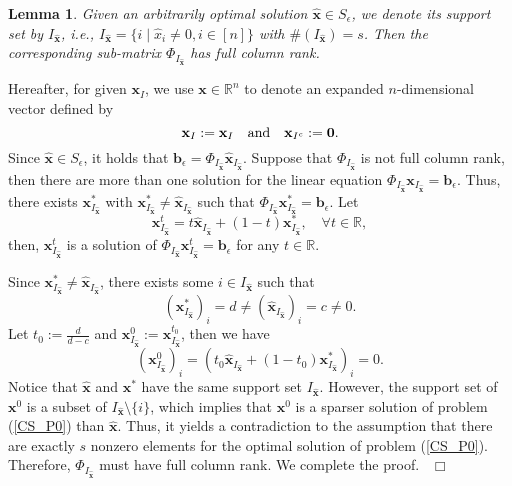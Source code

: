 \documentclass[12pt]{article}
\newtheorem{Lemma}{Lemma}[part]
\def \ep{\hbox{ }\hfill$\Box$}
\begin{document}
\begin{Lemma}\label{linearly_independent_columns}
Given an arbitrarily optimal solution $\hat{\mathbf{x}}\in S_\epsilon$, we denote its support set by $I_{\hat{\mathbf{x}}}$, i.e., $I_{\hat{\mathbf{x}}}=\{i\mid \hat{x}_i\neq0,i\in[n]\}$ with $\#(I_{\hat{\mathbf{x}}})=s$. Then the corresponding sub-matrix $\Phi_{I_{\hat{\mathbf{x}}}}$ has full column rank.
\end{Lemma}

Hereafter, for given $\mathbf{x}_I$,  we use $\mathbf{x}\in \mathbb{R}^n$ to denote an expanded $n$-dimensional vector defined by
$$
\mathbf{x}_I:=\mathbf{x}_I\quad\mbox{\rm and}\quad \mathbf{x}_{I^c}:=\mathbf{0}.
$$
Since $\hat{\mathbf{x}}\in S_\epsilon$, it holds that $\mathbf{b}_\epsilon=\Phi_{I_{\hat{\mathbf{x}}}}\hat{\mathbf{x}}_{I_{\hat{\mathbf{x}}}}$.
Suppose that $\Phi_{I_{\hat{\mathbf{x}}}}$ is not full column rank, then there are more than one solution for the linear equation $\Phi_{I_{\hat{\mathbf{x}}}}\mathbf{x}_{I_{\hat{\mathbf{x}}}}=\mathbf{b}_\epsilon$. Thus, there exists $\mathbf{x}_{I_{\hat{\mathbf{x}}}}^\ast$ with
$\mathbf{x}_{I_{\hat{\mathbf{x}}}}^\ast\neq\hat{\mathbf{x}}_{I_{\hat{\mathbf{x}}}}$
such that $\Phi_{I_{\hat{\mathbf{x}}}}\mathbf{x}^\ast_{I_{\hat{\mathbf{x}}}}=\mathbf{b}_\epsilon$.
Let
$$
\mathbf{x}_{I_{\hat{\mathbf{x}}}}^t =t\hat{\mathbf{x}}_{I_{\hat{\mathbf{x}}}}+(1-t)\mathbf{x}_{I_{\hat{\mathbf{x}}}}^\ast,\quad \forall t\in\mathbb{R},
$$
then, $\mathbf{x}_{I_{\hat{\mathbf{x}}}}^t$ is a solution of
$\Phi_{I_{\hat{\mathbf{x}}}}\mathbf{x}_{I_{\hat{\mathbf{x}}}}^t=\mathbf{b}_\epsilon$ for any $t\in\mathbb{R}$.

Since $\mathbf{x}_{I_{\hat{\mathbf{x}}}}^\ast\neq\hat{\mathbf{x}}_{I_{\hat{\mathbf{x}}}}$,
there exists some $i\in I_{\hat{\mathbf{x}}}$ such that
$$
(\mathbf{x}_{I_{\hat{\mathbf{x}}}}^\ast)_i=d\neq(\hat{\mathbf{x}}_{I_{\hat{\mathbf{x}}}})_i=c\neq 0.
$$
Let $t_0:=\frac{d}{d-c}$ and $\mathbf{x}_{I_{\hat{\mathbf{x}}}}^0:=\mathbf{x}_{I_{\hat{\mathbf{x}}}}^{t_0}$, then we have
$$
(\mathbf{x}^0_{I_{\hat{\mathbf{x}}}})_i =(t_0\hat{\mathbf{x}}_{I_{\hat{\mathbf{x}}}}+(1-t_0)\mathbf{x}_{I_{\hat{\mathbf{x}}}}^\ast)_i=0.
$$
Notice that $\hat{\mathbf{x}}$ and $\mathbf{x}^\ast$ have the same support set $I_{\hat{\mathbf{x}}}$. However, the support set of $\mathbf{x}^0$ is a subset of $I_{\hat{\mathbf{x}}}\setminus \{i\}$, which implies that $\mathbf{x}^0$ is a sparser solution of
problem (\ref{CS_P0}) than $\hat{\mathbf{x}}$. Thus, it yields a contradiction to the assumption that there are exactly $s$ nonzero elements for the optimal solution of problem (\ref{CS_P0}). Therefore,
$\Phi_{I_{\hat{\mathbf{x}}}}$ must have full column rank. We complete
the proof.
\ep
\end{document}
